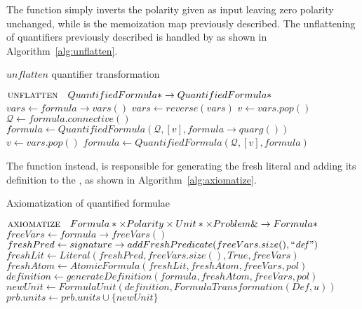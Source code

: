 The function  simply inverts the polarity given as input leaving zero polarity unchanged, while  is the memoization map previously described.
The unflattening of quantifiers previously described is handled by  as shown in Algorithm~\ref{alg:unflatten}.

\begin{algorithm}[H]
  \caption{\(unflatten\) quantifier transformation}\label{alg:unflatten}
    \begin{algorithmic}[1]
        \Statex{}  \(\textsc{unflatten}\quad QuantifiedFormula*\to QuantifiedFormula*\)
            \State{} \(vars \gets formula\to vars()\)
            \State{} \(vars \gets reverse(vars)\)
            \State{} \(v \gets vars.pop()\)
            \State{} \(\mathcal{Q} \gets formula.connective()\)
            \State{} \(formula \gets QuantifiedFormula(\mathcal{Q},[v],formula\to quarg())\)
              \State{} \(v \gets vars.pop()\)
              \State{} \(formula \gets QuantifiedFormula(\mathcal{Q},[v],formula)\)
            \EndWhile{}
            \State{} 
        \EndFunction{}
    \end{algorithmic}
\end{algorithm}

The function  instead, is responsible for generating the fresh literal and adding its definition to the , as shown in Algorithm~\ref{alg:axiomatize}.

\begin{algorithm}[H]
  \caption{Axiomatization of quantified formulae}\label{alg:axiomatize}
    \begin{algorithmic}[1]
        \Statex{}  \(\textsc{axiomatize}\quad Formula*\times Polarity\times Unit*\times Problem\&\to Formula*\)
            \State{} \(freeVars \gets formula\to freeVars()\)
            \State{} \(freshPred \gets signature\to addFreshPredicate(freeVars.size(), \text{``\emph{def}''})\)
            \State{} \(freshLit \gets Literal(freshPred, freeVars.size(), True, freeVars)\)
            \State{} \(freshAtom \gets AtomicFormula(freshLit,freshAtom,freeVars,pol)\)
            \State{} \(definition \gets generateDefinition(formula,freshAtom,freeVars,pol)\)
            \State{} \(newUnit \gets FormulaUnit(definition, FormulaTransformation(Def,u))\)
            \State{} \(prb.units \gets prb.units \cup \{newUnit\}\)
            \State{} 
        \EndFunction{}
    \end{algorithmic}  
\end{algorithm}

